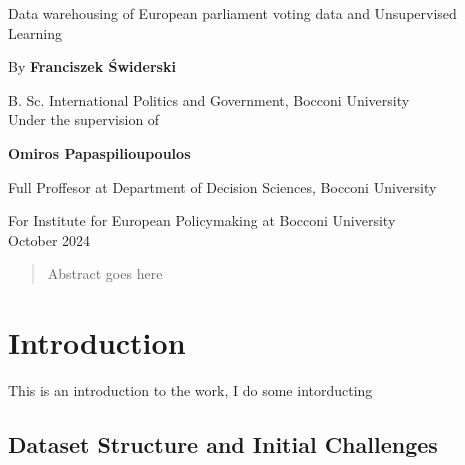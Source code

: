 \documentclass{report}
\begin{document}
    \begin{titlepage}
        \centering

        {\Huge Data warehousing of European parliament voting data and Unsupervised Learning\\}

        \vspace{1cm}

        {By \textbf{Franciszek Świderski}\\}

        \vspace{1cm}

        {B. Sc. International Politics and Government, Bocconi University\\}
        \vspace{1cm}
        {Under the supervision of\\}
        \vspace{1cm}

        {\textbf{Omiros Papaspilioupoulos}\\}

        \vspace{1cm}
        {Full Proffesor at Department of Decision Sciences, Bocconi University\\}
        \vspace{1cm}

        {For Institute for European Policymaking at Bocconi University\\}
        \vspace{1cm}
        {October 2024\\}

        \vspace{5cm} %


    \end{titlepage}

    \begin{abstract}
        Abstract goes here
    \end{abstract}

    \tableofcontents


    \chapter{Introduction}
    This is an introduction to the work, I do some intorducting


    \section{Dataset Structure and Initial Challenges}
\end{document}
